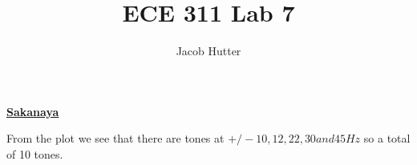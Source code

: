 \documentclass{article}
\author{Jacob Hutter}
\title{ECE 311 Lab 7}
\begin{document}
\maketitle

\color{red}
\underline{\textbf{Sakanaya}}
\color{black}


\begin{center}
\end{center}
From the plot we see that there are tones at $+/- 10,12,22,30 and 45 Hz$ so a total of 10 tones.

\clearpage
\end{document}
